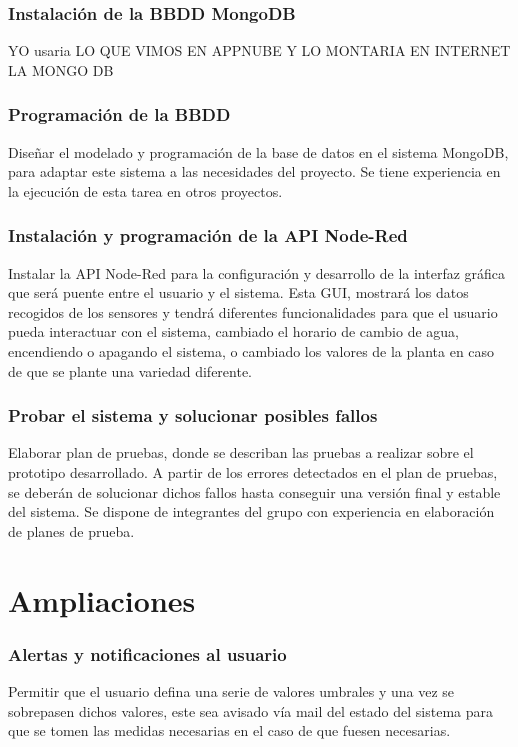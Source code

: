 \documentclass[12pt,a4paper,titlepage,oneside]{report}
\begin{document}
	\subsection*{Instalación de la BBDD MongoDB}
	YO usaria LO QUE VIMOS EN APPNUBE Y LO MONTARIA EN INTERNET LA MONGO DB
	
	\subsection*{Programación de la BBDD}
	Diseñar el modelado y programación de la base de datos en el sistema MongoDB, para adaptar este sistema a las necesidades del proyecto. Se tiene experiencia en la ejecución de esta tarea en otros proyectos.
	
	\subsection*{Instalación y programación de la API Node-Red}
	Instalar la API Node-Red para la configuración y desarrollo de la interfaz gráfica que será puente entre el usuario y el sistema. Esta GUI, mostrará los datos recogidos de los sensores y tendrá diferentes funcionalidades para que el usuario pueda interactuar con el sistema, cambiado el horario de cambio de agua, encendiendo o apagando el sistema, o cambiado los valores de la planta en caso de que se plante una variedad diferente.
	
	\subsection*{Probar el sistema y solucionar posibles fallos}
	Elaborar plan de pruebas, donde se describan las pruebas a realizar sobre el prototipo desarrollado. A partir de los errores detectados en el plan de pruebas, se deberán de solucionar dichos fallos hasta conseguir una versión final y estable del sistema.
Se dispone de integrantes del grupo con experiencia en elaboración de planes de prueba.
	

\chapter{Ampliaciones}

\subsection*{Alertas y notificaciones al usuario}
	Permitir que el usuario defina una serie de valores umbrales y una vez se sobrepasen dichos valores, este sea avisado vía mail del estado del sistema para que se tomen las medidas necesarias en el caso de que fuesen necesarias.
\end{document}
